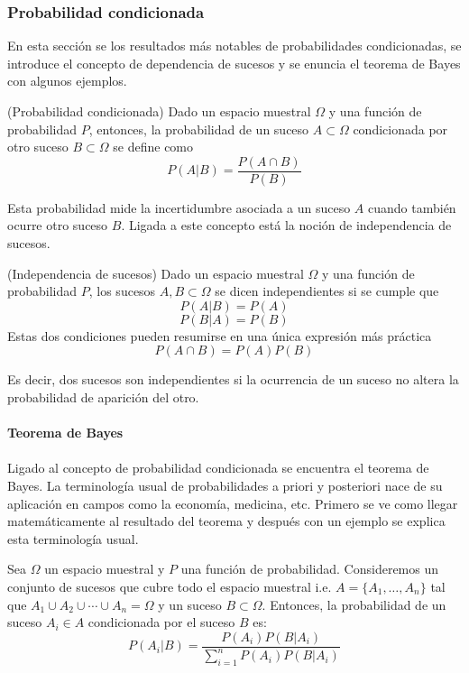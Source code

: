 \subsubsection{Probabilidad condicionada}
En esta sección se los resultados más notables de probabilidades condicionadas, se introduce el concepto de dependencia de sucesos y se enuncia el teorema de Bayes con algunos ejemplos.
\begin{definition}(Probabilidad condicionada)
Dado un espacio muestral $\Omega$ y una función de probabilidad $P$, entonces, la probabilidad de un suceso $A \subset \Omega$ condicionada por otro suceso $B \subset \Omega$ se define como 
$$P(A|B) = \frac{P(A \cap B)}{P(B)}$$ \label{def: cond}
\end{definition}
Esta probabilidad mide la incertidumbre asociada a un suceso $A$ cuando también ocurre otro suceso $B$. Ligada a este concepto está la noción de independencia de sucesos.
\begin{definition}(Independencia de sucesos)
	Dado un espacio muestral $\Omega$ y una función de probabilidad $P$, los sucesos $A, B \subset \Omega$ se dicen independientes si se cumple que $$P(A|B) = P(A)$$ $$P(B|A) = P(B)$$
	Estas dos condiciones pueden resumirse en una única expresión más práctica
	$$P(A \cap B) = P(A)P(B)$$	\label{def: independencia}
\end{definition}
Es decir, dos sucesos son independientes si la ocurrencia de un suceso no altera la probabilidad de aparición del otro.\\\\
\textbf{Teorema de Bayes}\\\\
Ligado al concepto de probabilidad condicionada se encuentra el teorema de Bayes. La terminología usual de probabilidades a priori y posteriori nace de su aplicación en campos como la economía, medicina, etc. Primero se ve como llegar matemáticamente al resultado del teorema y después con un ejemplo se explica esta terminología usual.
\begin{theorem}
Sea $\Omega$ un espacio muestral y $P$ una función de probabilidad. Consideremos un conjunto de sucesos que cubre todo el espacio muestral i.e. $A = \lbrace A_1,\ldots, A_n\rbrace$ tal que $A_1 \cup A_2 \cup \cdots \cup A_n = \Omega$ y un suceso $B \subset \Omega$. Entonces, la probabilidad de un suceso $A_i \in A$ condicionada por el suceso $B$ es:
$$P(A_i| B) = \frac{P(A_i)P(B|A_i)}{\sum_{i=1}^{n}{P(A_i)P(B|A_i)}}$$\label{th: Bayes}
\end{theorem}
